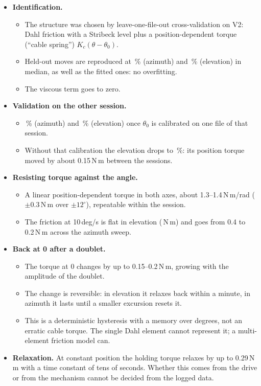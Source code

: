 \documentclass[10pt,a4paper]{article}
\numberwithin{equation}{section}
\begin{document}
\begin{itemize}
\item \textbf{Identification.}
  \begin{itemize}
  \item The structure was chosen by leave-one-file-out cross-validation on V2: Dahl friction with a Stribeck level plus a position-dependent torque (``cable spring'') $K_c(\theta-\theta_0)$.
  \item Held-out moves are reproduced at \cvSelAz\,\% (azimuth) and \cvSelEl\,\% (elevation) in median, as well as the fitted ones: no overfitting.
  \item The viscous term goes to zero.
  \end{itemize}
\item \textbf{Validation on the other session.}
  \begin{itemize}
  \item \fitValSesAz\,\% (azimuth) and \fitValSesEl\,\% (elevation) once $\theta_0$ is calibrated on one file of that session.
  \item Without that calibration the elevation drops to \fitValEl\,\%: its position torque moved by about 0.15\,N\,m between the sessions.
  \end{itemize}
\item \textbf{Resisting torque against the angle.}
  \begin{itemize}
  \item A linear position-dependent torque in both axes, about 1.3--1.4\,N\,m/rad ($\pm0.3$\,N\,m over $\pm12^\circ$), repeatable within the session.
  \item The friction at 10\,deg/s is flat in elevation (\FencEl\,N\,m) and goes from 0.4 to 0.2\,N\,m across the azimuth sweep.
  \end{itemize}
\item \textbf{Back at 0 after a doublet.}
  \begin{itemize}
  \item The torque at 0 changes by up to 0.15--0.2\,N\,m, growing with the amplitude of the doublet.
  \item The change is reversible: in elevation it relaxes back within a minute, in azimuth it lasts until a smaller excursion resets it.
  \item This is a deterministic hysteresis with a memory over degrees, not an erratic cable torque. The single Dahl element cannot represent it; a multi-element friction model can.
  \end{itemize}
\item \textbf{Relaxation.} At constant position the holding torque relaxes by up to 0.29\,N\,m with a time constant of tens of seconds. Whether this comes from the drive or from the mechanism cannot be decided from the logged data.
\end{itemize}
\end{document}
